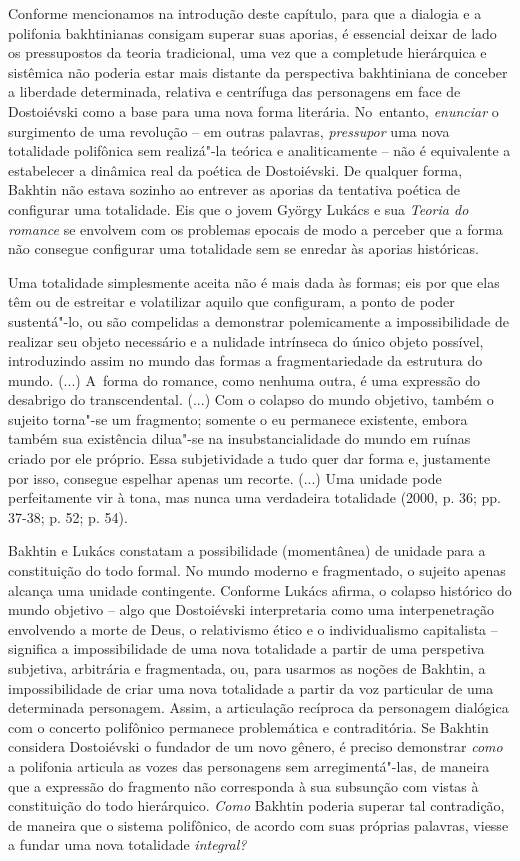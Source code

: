 {Conforme mencionamos na introdução deste capítulo, para que a dialogia e
a polifonia bakhtinianas consigam superar suas aporias, é essencial
deixar de lado os pressupostos da teoria tradicional, uma vez que a
completude hierárquica e sistêmica não poderia estar mais distante da
perspectiva bakhtiniana de conceber a liberdade determinada, relativa e
centrífuga das personagens em face de Dostoiévski como a base para uma
nova forma literária. No~entanto, \emph{enunciar} o surgimento de uma
revolução -- em outras palavras, \emph{pressupor} uma nova totalidade
polifônica sem realizá"-la teórica e analiticamente -- não é equivalente
a estabelecer a dinâmica real da poética de Dostoiévski. De qualquer
forma, Bakhtin não estava sozinho ao entrever as aporias da tentativa
poética de configurar uma totalidade. Eis que o jovem György Lukács e
sua \emph{Teoria do romance} se envolvem com os problemas epocais de
modo a perceber que a forma não consegue configurar uma totalidade sem
se enredar às aporias históricas.

Uma totalidade simplesmente aceita não é mais dada às formas; eis por
que elas têm ou de estreitar e volatilizar aquilo que configuram, a
ponto de poder sustentá"-lo, ou são compelidas a demonstrar polemicamente
a impossibilidade de realizar seu objeto necessário e a nulidade
intrínseca do único objeto possível, introduzindo assim no mundo das
formas a fragmentariedade da estrutura do mundo. (...) A~forma do
romance, como nenhuma outra, é uma expressão do desabrigo do
transcendental. (...) Com o colapso do mundo objetivo, também o sujeito
torna"-se um fragmento; somente o eu permanece existente, embora também
sua existência dilua"-se na insubstancialidade do mundo em ruínas criado
por ele próprio. Essa subjetividade a tudo quer dar forma e, justamente
por isso, consegue espelhar apenas um recorte. (...) Uma unidade pode
perfeitamente vir à tona, mas nunca uma verdadeira totalidade (2000, p.
36; pp. 37-38; p. 52; p. 54).

Bakhtin e Lukács constatam a possibilidade (momentânea) de unidade para
a constituição do todo formal. No mundo moderno e fragmentado, o sujeito
apenas alcança uma unidade contingente. Conforme Lukács afirma, o
colapso histórico do mundo objetivo -- algo que Dostoiévski
interpretaria como uma interpenetração envolvendo a morte de Deus, o
relativismo ético e o individualismo capitalista -- significa a
impossibilidade de uma nova totalidade a partir de uma perspetiva
subjetiva, arbitrária e fragmentada, ou, para usarmos as noções de
Bakhtin, a impossibilidade de criar uma nova totalidade a partir da voz
particular de uma determinada personagem. Assim, a articulação recíproca
da personagem dialógica com o concerto polifônico permanece problemática
e contraditória. Se Bakhtin considera Dostoiévski o fundador de um novo
gênero, é preciso demonstrar \emph{como} a polifonia articula as vozes
das personagens sem arregimentá"-las, de maneira que a expressão do
fragmento não corresponda à sua subsunção com vistas à constituição do
todo hierárquico. \emph{Como} Bakhtin poderia superar tal contradição,
de maneira que o sistema polifônico, de acordo com suas próprias
palavras, viesse a fundar uma nova totalidade \emph{integral? }

}
